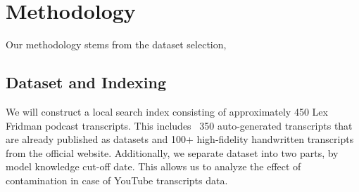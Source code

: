 \documentclass[11pt]{article}
\begin{document}




\section{Methodology}
Our methodology stems from the dataset selection, 

\subsection{Dataset and Indexing}
We will construct a local search index consisting of approximately 450 Lex Fridman podcast transcripts. This includes ~350 auto-generated transcripts that are already published as datasets and 100+ high-fidelity handwritten transcripts from the official website. Additionally, we separate dataset into two parts, by model knowledge cut-off date. This allows us to analyze the effect of contamination in case of YouTube transcripts data. 
\end{document}
